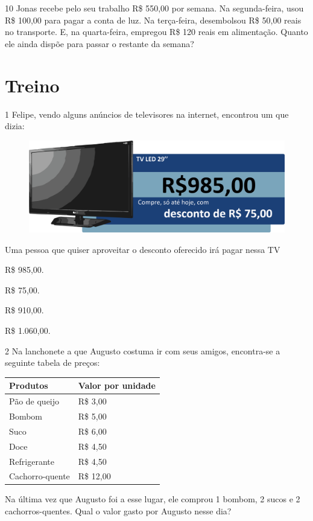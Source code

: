 \num{10} Jonas recebe pelo seu trabalho R\$ 550,00 por semana. Na segunda-feira, usou R\$ 100,00 para pagar a conta de luz. Na terça-feira, desembolsou R\$ 50,00 reais no transporte. E, na quarta-feira, empregou R\$ 120 reais em alimentação. Quanto ele ainda dispõe para passar o restante da semana?

\pagebreak
\section*{Treino}

\num{1} Felipe, vendo alguns anúncios de televisores na internet, encontrou um que dizia:

\begin{figure}[htpb!]
\centering
\includegraphics[width=.8\textwidth]{./media/image73.png}
\end{figure}

Uma pessoa que quiser aproveitar o desconto oferecido irá pagar nessa TV

\begin{escolha}
\item
  R\$ 985,00.
\item
  R\$ 75,00.
\item
  R\$ 910,00.
\item
  R\$ 1.060,00.
\end{escolha}

\num{2} Na lanchonete a que Augusto costuma ir com seus amigos, encontra-se a
seguinte tabela de preços:

\begin{longtable}[]{@{}ll@{}}
\toprule
\hline
\textbf{Produtos} & \textbf{Valor por unidade}\tabularnewline
\hline
\midrule
\endhead
Pão de queijo & R\$ 3,00\tabularnewline
\hline
Bombom & R\$ 5,00\tabularnewline
\hline
Suco & R\$ 6,00\tabularnewline
\hline
Doce & R\$ 4,50\tabularnewline
\hline
Refrigerante & R\$ 4,50\tabularnewline
\hline
Cachorro-quente & R\$ 12,00\tabularnewline
\bottomrule
\end{longtable}

Na última vez que Augusto foi a esse lugar, ele comprou 1 bombom, 2
sucos e 2 cachorros-quentes. Qual o valor gasto por Augusto nesse dia?

